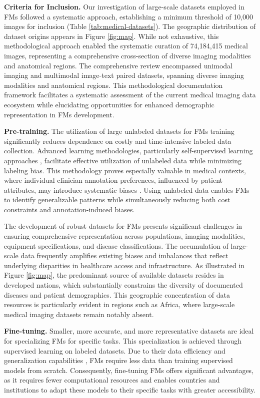 \textbf{Criteria for Inclusion.} Our investigation of large-scale datasets employed in FMs followed a systematic approach, establishing a minimum threshold of 10,000 images for inclusion (Table \ref{tab:medical-datasets}). The geographic distribution of dataset origins appears in Figure \ref{fig:map}. While not exhaustive, this methodological approach enabled the systematic curation of 74,184,415 medical images, representing a comprehensive cross-section of diverse imaging modalities and anatomical regions. The comprehensive review encompassed unimodal imaging and multimodal image-text paired datasets, spanning diverse imaging modalities and anatomical regions. This methodological documentation framework facilitates a systematic assessment of the current medical imaging data ecosystem while elucidating opportunities for enhanced demographic representation in FMs development.

\textbf{Pre-training.} The utilization of large unlabeled datasets for FMs training significantly reduces dependence on costly and time-intensive labeled data collection. Advanced learning methodologies, particularly self-supervised learning approaches \cite{chen_simple_2020, he_masked_2021, assran_self-supervised_2023}, facilitate effective utilization of unlabeled data while minimizing labeling bias. This methodology proves especially valuable in medical contexts, where individual clinician annotation preferences, influenced by patient attributes, may introduce systematic biases \cite{berhane_patients_2015}. Using unlabeled data enables FMs to identify generalizable patterns while simultaneously reducing both cost constraints and annotation-induced biases.

The development of robust datasets for FMs presents significant challenges in ensuring comprehensive representation across populations, imaging modalities, equipment specifications, and disease classifications. The accumulation of large-scale data frequently amplifies existing biases and imbalances that reflect underlying disparities in healthcare access and infrastructure. As illustrated in Figure \ref{fig:map}, the predominant source of available datasets resides in developed nations, which substantially constrains the diversity of documented diseases and patient demographics. This geographic concentration of data resources is particularly evident in regions such as Africa, where large-scale medical imaging datasets remain notably absent.

\textbf{Fine-tuning.} Smaller, more accurate, and more representative datasets are ideal for specializing FMs for specific tasks. This specialization is achieved through supervised learning on labeled datasets. Due to their data efficiency and generalization capabilities \cite{zhou_foundation_2023, azizi_robust_2023, lu_towards_2023, tu_towards_2023}, FMs require less data than training supervised models from scratch. Consequently, fine-tuning FMs offers significant advantages, as it requires fewer computational resources and enables countries and institutions to adapt these models to their specific tasks with greater accessibility.

